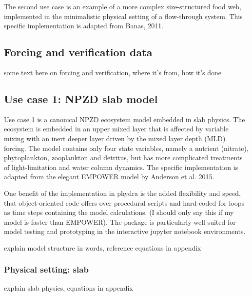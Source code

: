 \documentclass[journal abbreviation, manuscript]{copernicus}
\begin{document}
The second use case is an example of a more complex size-structured food web, implemented in the minimalistic physical setting of a flow-through system. This specific implementation is adapted from Banas, 2011.




\subsection{Forcing and verification data}

some text here on forcing and verification, where it's from, how it's done


\subsection{Use case 1: NPZD slab model}

Use case 1 is a canonical NPZD ecosystem model embedded in slab physics. The ecosystem is embedded in an upper mixed layer that is affected by variable mixing with an inert deeper layer driven by the mixed layer depth (MLD) forcing. The model contains only four state variables, namely a nutrient  (nitrate), phytoplankton, zooplankton and detritus, but has more complicated treatments of light-limitation and water column dynamics. The specific implementation is adapted from the elegant EMPOWER model by Anderson et al. 2015. 

One benefit of the implementation in phydra is the added flexibility and speed, that object-oriented code offers over procedural scripts and hard-coded for loops as time steps containing the model calculations. (I should only say this if my model is faster than EMPOWER). The package is particularly well suited for model testing and prototyping in the interactive jupyter notebook environments. 

explain model structure in words, reference equations in appendix

\subsubsection{Physical setting: slab}
explain slab physics, equations in appendix
\end{document}
